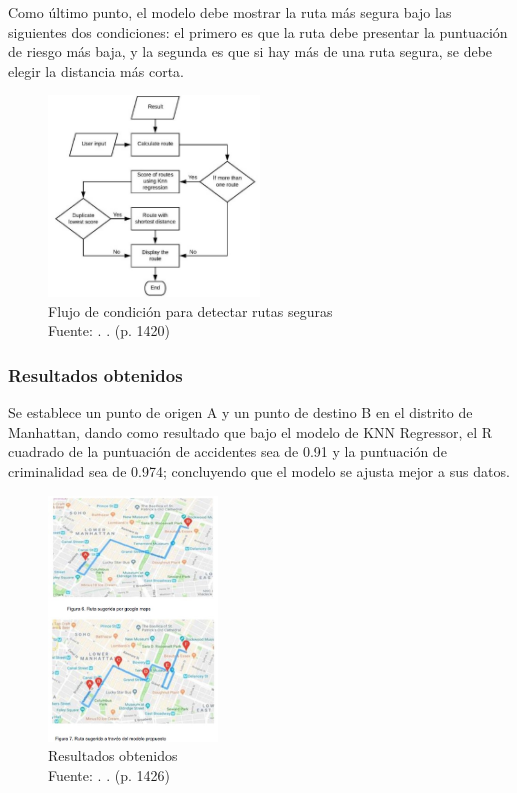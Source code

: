 Como último punto, el modelo debe mostrar la ruta más segura bajo las siguientes dos condiciones: el primero es que la ruta debe presentar la puntuación de riesgo más baja, y la segunda es que si hay más de una ruta segura, se debe elegir la distancia más corta.
\begin{figure}[h]
	\begin{center}
		\includegraphics[width=0.5\textwidth]{2/figures/CondicionSafe.jpg}
		\caption{Flujo de condición para detectar rutas seguras\\
			Fuente: \citep*{pr_Soni}. . (p. 1420)}
		\label{1:fig2}
	\end{center}
\end{figure}

\subsubsection{Resultados obtenidos}
Se establece un punto de origen A y un punto de destino B en el distrito de Manhattan, dando como resultado que bajo el modelo de KNN Regressor, el R cuadrado de la puntuación de accidentes sea de 0.91 y la puntuación de criminalidad sea de 0.974; concluyendo que el modelo se ajusta mejor a sus datos.

\begin{figure}[h]
	\begin{center}
		\includegraphics[width=0.4\textwidth]{2/figures/resultRoute.jpg}
		\caption{Resultados obtenidos\\
			Fuente: \citep*{pr_Soni}. . (p. 1426)}
		\label{1:fig2}
	\end{center}
\end{figure}

